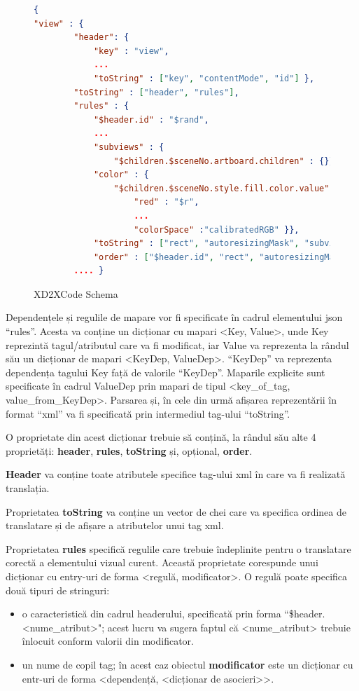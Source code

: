 \begin{figure}
\begin{lstlisting}[language=json,firstnumber=1]
{
"view" : {
        "header": {
            "key" : "view",
            ...
            "toString" : ["key", "contentMode", "id"] },
        "toString" : ["header", "rules"],
        "rules" : { 
            "$header.id" : "$rand",
            ...
            "subviews" : {
                "$children.$sceneNo.artboard.children" : {}},
            "color" : {
                "$children.$sceneNo.style.fill.color.value" : {
                    "red" : "$r",
                    ...
                    "colorSpace" :"calibratedRGB" }},
            "toString" : ["rect", "autoresizingMask", "subviews", "color"],
            "order" : ["$header.id", "rect", "autoresizingMask", "color", "subviews"] }
        .... }
\end{lstlisting}
\caption{XD2XCode Schema} \label{fig:XD2XCode Schema}
\end{figure}




Dependențele și regulile de mapare vor fi specificate în cadrul elementului json “rules”. Acesta va conține un dicționar cu mapari <Key, Value>, unde Key reprezintă tagul/atributul care va fi modificat, iar Value va reprezenta la rândul său un dicționar de mapari <KeyDep, ValueDep>.  “KeyDep” va reprezenta dependența tagului Key față de valorile “KeyDep”. Maparile explicite sunt specificate în cadrul ValueDep prin mapari de tipul <key_of_tag, value_from_KeyDep>. 
Parsarea și, în cele din urmă afișarea reprezentării în format “xml” va fi specificată prin intermediul tag-ului “toString”. 

O proprietate din acest dicționar trebuie să conțină, la rândul său alte 4 proprietăți: \textbf{header}, \textbf{rules}, \textbf{toString} și, opțional, \textbf{order}. 

\textbf{Header} va conține toate atributele specifice tag-ului xml în care va fi realizată translația. 

Proprietatea \textbf{toString} va conține un vector de chei care va specifica ordinea de translatare și de afișare a atributelor unui tag xml. 

Proprietatea \textbf{rules} specifică regulile care trebuie îndeplinite pentru o translatare corectă a elementului vizual curent. Această proprietate corespunde unui dicționar cu entry-uri de forma <regulă, modificator>.
O regulă poate specifica două tipuri de stringuri:

\begin{itemize}  
\item o caracteristică din cadrul headerului, specificată prin forma ``\$header.<nume_atribut>"; acest lucru va sugera faptul că <nume_atribut> trebuie înlocuit conform valorii  din modificator.
\item un nume de copil tag; în acest caz obiectul \textbf{modificator} este un dicționar cu entr-uri de forma <dependență, <dicționar de asocieri>>.
\end{itemize}
 
